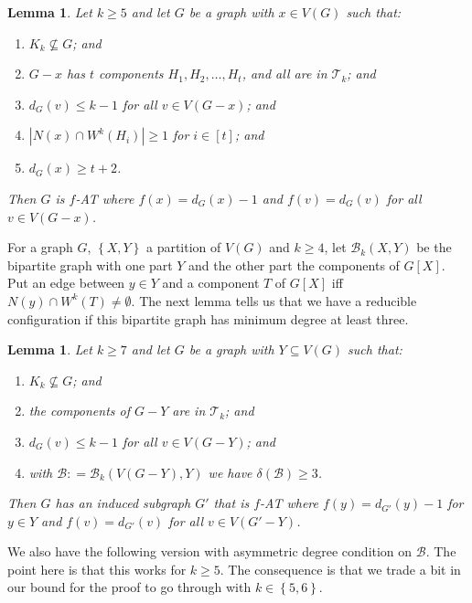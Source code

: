 \documentclass[10pt]{article}
\theoremstyle{plain}
\newtheorem{lem}[thm]{Lemma}
\theoremstyle{definition}
\theoremstyle{remark}
\newcommand{\fancy}[1]{\mathcal{#1}}
\newcommand{\T}{\fancy{T}}
\newcommand{\B}{\fancy{B}}
\newcommand{\set}[1]{\left\{ #1 \right\}}
\newcommand{\card}[1]{\left|#1\right|}
\newcommand{\irange}[1]{\left[#1\right]}
\newcommand{\DefinedAs}{\mathrel{\mathop:}=}
\begin{document}
\begin{lem}\label{ConfigurationTypeOneEuler}
Let $k \ge 5$ and let $G$ be a graph with $x \in V(G)$ such that:
\begin{enumerate}
\item $K_k \not \subseteq G$; and
\item $G-x$ has $t$ components $H_1, H_2, \ldots, H_t$, and all are in $\T_k$; and
\item $d_G(v) \leq k - 1$ for all $v \in V(G-x)$; and
\item $\card{N(x) \cap W^k(H_i)} \ge 1$ for $i \in \irange{t}$; and
\item $d_G(x) \ge t+2$.
\end{enumerate}

\noindent Then $G$ is $f$-AT where $f(x) = d_G(x) - 1$ and $f(v) = d_G(v)$ for all $v \in V(G - x)$.
\end{lem}

For a graph $G$, $\set{X, Y}$ a partition of $V(G)$ and $k \ge 4$, let $\B_k(X, Y)$ be the bipartite graph with one part $Y$ and the other part the components of $G[X]$.  Put an edge between $y \in Y$ and a component $T$ of $G[X]$ iff $N(y) \cap W^k(T) \ne \emptyset$.   The next lemma tells us that we have a reducible configuration if this bipartite graph has minimum degree at least three.  

\begin{lem}
	\label{MultipleHighConfigurationEuler} Let $k\ge7$ and let $G$ be a graph with
	$Y\subseteq V(G)$ such that: 
	\begin{enumerate}
		\item $K_{k}\not\subseteq G$; and 
		\item the components of $G-Y$ are in $\T_{k}$; and 
		\item $d_{G}(v)\leq k-1$ for all $v\in V(G-Y)$; and 
		\item with $\B\DefinedAs\B_{k}(V(G-Y),Y)$ we have $\delta(\B)\ge3$. 
	\end{enumerate}
	\noindent Then $G$ has an induced subgraph $G'$ that is $f$-AT where $f(y)=d_{G'}(y)-1$
	for $y\in Y$ and $f(v)=d_{G'}(v)$ for all $v\in V(G'-Y)$.\end{lem}

We also have the following version with asymmetric degree condition on $\B$.  
The point here is that this works for $k \ge 5$.  
The consequence is that we trade a bit in our bound for the proof to go through with $k \in \set{5,6}$.
\end{document}
